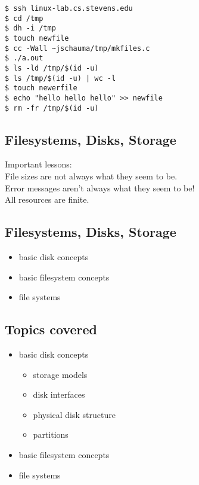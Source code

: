 \documentclass[xga]{xdvislides}
\begin{document}
\begin{verbatim}
$ ssh linux-lab.cs.stevens.edu
$ cd /tmp
$ dh -i /tmp
$ touch newfile
$ cc -Wall ~jschauma/tmp/mkfiles.c
$ ./a.out
$ ls -ld /tmp/$(id -u)
$ ls /tmp/$(id -u) | wc -l
$ touch newerfile
$ echo "hello hello hello" >> newfile
$ rm -fr /tmp/$(id -u)
\end{verbatim}

\subsection{Filesystems, Disks, Storage}
Important lessons: \\

File sizes are not always what they seem to be. \\

Error messages aren't always what they seem to be! \\

All resources are finite.


\subsection{Filesystems, Disks, Storage}
\begin{itemize}
	\item basic disk concepts
	\item basic filesystem concepts
	\item file systems
\end{itemize}

\subsection{Topics covered}
\begin{itemize}
	\item basic disk concepts
		\begin{itemize}
			\item storage models
			\item disk interfaces
			\item physical disk structure
			\item partitions
		\end{itemize}
	\item basic filesystem concepts
	\item file systems
\end{itemize}
\end{document}
